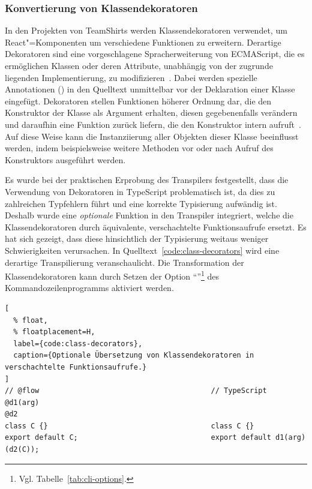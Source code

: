 \subsubsection{Konvertierung von Klassendekoratoren}
\label{sec:class-decorators}

In den Projekten von TeamShirts werden Klassendekoratoren verwendet, um React"=Komponenten um verschiedene Funktionen zu erweitern. Derartige Dekoratoren sind eine vorgeschlagene Spracherweiterung von ECMAScript, die es ermöglichen Klassen oder deren Attribute, unabhängig von der zugrunde liegenden Implementierung, zu modifizieren~\autocite{ES_PROPOSAL:DECORATORS}. Dabei werden spezielle Annotationen () in den Quelltext unmittelbar vor der Deklaration einer Klasse eingefügt. Dekoratoren stellen Funktionen höherer Ordnung dar, die den Konstruktor der Klasse als Argument erhalten, diesen gegebenenfalls verändern und daraufhin eine Funktion zurück liefern, die den Konstruktor intern aufruft~\autocite{ES_PROPOSAL:DECORATORS}. Auf diese Weise kann die Instanziierung aller Objekten dieser Klasse beeinflusst werden, indem beispielsweise weitere Methoden vor oder nach Aufruf des Konstruktors ausgeführt werden.

Es wurde bei der praktischen Erprobung des Transpilers festgestellt, dass die Verwendung von Dekoratoren in TypeScript problematisch ist, da dies zu zahlreichen Typfehlern führt und eine korrekte Typisierung aufwändig ist. Deshalb wurde eine \emph{optionale} Funktion in den Transpiler integriert, welche die Klassendekoratoren durch äquivalente, verschachtelte Funktionsaufrufe ersetzt. Es hat sich gezeigt, dass diese hinsichtlich der Typisierung weitaus weniger Schwierigkeiten verursachen. In Quelltext~\ref{code:class-decorators} wird eine derartige Transpilierung veranschaulicht. Die Transformation der Klassendekoratoren kann durch Setzen der Option \enquote{}\footnote{Vgl. Tabelle~\ref{tab:cli-options}.} des Kommandozeilenprogramms aktiviert werden.

\begin{lstlisting}[
  % float,
  % floatplacement=H,
  label={code:class-decorators},
  caption={Optionale Übersetzung von Klassendekoratoren in verschachtelte Funktionsaufrufe.}
]
// @flow                                        // TypeScript
@d1(arg)
@d2
class C {}                                      class C {}
export default C;                               export default d1(arg)(d2(C));
\end{lstlisting}

